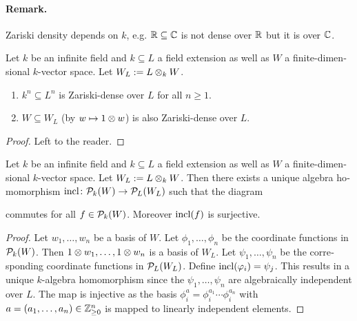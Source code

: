 \documentclass[12pt,a4paper]{scrartcl}
\theoremstyle{cplain}
\theoremstyle{cplain}
\theoremstyle{cplain}
\theoremstyle{definition}
\begin{document}
\begin{otherlanguage}{english}
\paragraph{Remark.}
Zariski density depends on $k$, e.g. $\mathbb R \subseteq \mathbb C$ is not dense over $\mathbb R$ but it is over $\mathbb C$.

\begin{lem} \label{lem:IV.4}
  Let $k$ be an infinite field and $k \subseteq L$ a field extension as well as $W$ a finite-dimensional $k$-vector space. Let $W_L := L \otimes_k W$.
  \begin{enumerate}
    \item $k^n \subseteq L^n$ is Zariski-dense over $L$ for all $n\ge 1$.
    \item\label{lem:IV.4:2} $W \subseteq W_L$ (by $w \mapsto 1 \otimes w$) is also Zariski-dense over $L$.
  \end{enumerate}
\end{lem}
\begin{proof}
  Left to the reader.
\end{proof}

\begin{lem} \label{lem:IV.5}
  Let $k$ be an infinite field and $k \subseteq L$ a field extension as well as $W$ a finite-dimensional $k$-vector space. Let $W_L := L \otimes_k W$. Then there exists a unique algebra homomorphism $\operatorname{incl}\colon\mathcal{P}_k(W) \to \mathcal{P}_L(W_L)$ such that the diagram
  \begin{center}
  \end{center}
  commutes for all $f\in \mathcal{P}_k(W)$. Moreover $\operatorname{incl}(f)$ is surjective.
\end{lem}
\begin{proof}
  Let $w_1,\ldots,w_n$ be a basis of $W$. Let $\phi_1,\ldots,\phi_n$ be the coordinate functions in $\mathcal{P}_k(W)$. Then $1\otimes w_1,\ldots,1\otimes w_n$ is a basis of $W_L$. Let $\psi_1,\ldots,\psi_n$ be the corresponding coordinate functions in $\mathcal{P}_L(W_L)$. Define $\operatorname{incl}(\varphi_i) = \psi_j$. This results in a unique $k$-algebra homomorphism since the $\psi_1,\ldots,\psi_n$ are algebraically independent over $L$. The map is injective as the basis $\phi_i^a = \phi_i^{a_1}\cdots\phi_i^{a_n}$ with $a = (a_1,\ldots,a_n) \in \mathbb Z_{\ge 0}^n$ is mapped to linearly independent elements.
 

\end{proof}
\end{otherlanguage}
\end{document}
